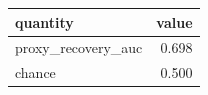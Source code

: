 \begin{tabular}{lr}
\toprule
quantity & value \\
\midrule
proxy_recovery_auc & 0.698 \\
chance & 0.500 \\
\bottomrule
\end{tabular}
